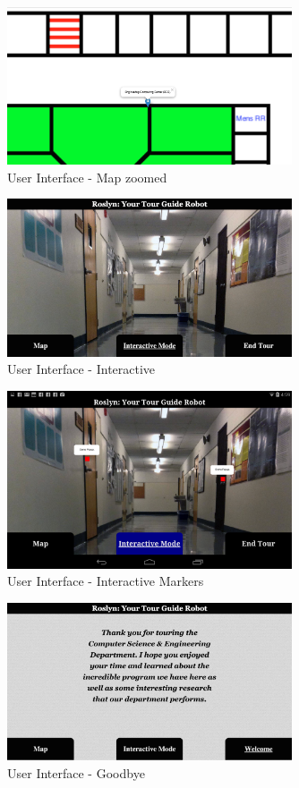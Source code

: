 \documentclass[11pt]{report}
\begin{document}
\begin{figure}[H]
 \centering
 \includegraphics[width=0.75\textwidth]{ui5.png}
 \caption{User Interface - Map zoomed}
 \label{fig:ui5}
\end{figure}
\begin{figure}[H]
 \centering
 \includegraphics[width=0.75\textwidth]{ui6.png}
 \caption{User Interface - Interactive}
 \label{fig:ui6}
\end{figure}
\begin{figure}[H]
 \centering
 \includegraphics[width=0.75\textwidth]{ui7.png}
 \caption{User Interface - Interactive Markers}
 \label{fig:ui7}
\end{figure}
\begin{figure}[H]
 \centering
 \includegraphics[width=0.75\textwidth]{ui8.png}
 \caption{User Interface - Goodbye}
 \label{fig:ui8}
\end{figure}
\end{document}
